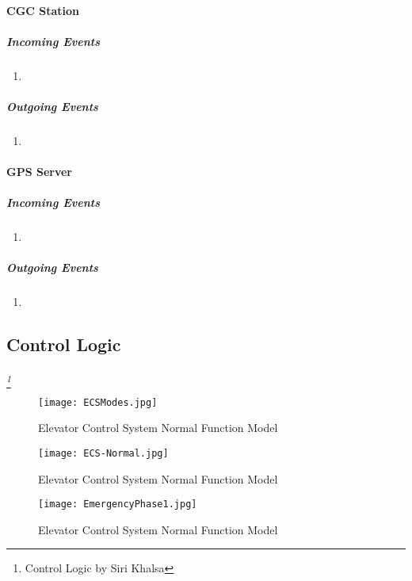\documentclass[12pt]{article}
\begin{document}
		\paragraph{CGC Station}
		\textit{}
			\subparagraph{Incoming Events}
				\begin{enumerate}
					\item 
				\end{enumerate}
				
			\subparagraph{Outgoing Events}
				\begin{enumerate}
					\item 
				\end{enumerate}

		\paragraph{GPS Server}
		\textit{}
			\subparagraph{Incoming Events}
				\begin{enumerate}
					\item 
				\end{enumerate}
				
			\subparagraph{Outgoing Events}
				\begin{enumerate}
					\item 
				\end{enumerate}
				
		
		
		\subsection{Control Logic} \label{logic}%
		\paragraph{} \textit{ \footnote{Control Logic by Siri Khalsa}}

		\begin{figure}[H]
  			\centerline{\texttt{[image: ECSModes.jpg]}}
  			\caption{Elevator Control System Normal Function Model }
  			\label{fig:normal}
		\end{figure}

		\begin{figure}[H]
  			\centerline{\texttt{[image: ECS-Normal.jpg]}}
  			\caption{Elevator Control System Normal Function Model }
  			\label{fig:normal}
		\end{figure}
	
		\begin{figure}[H]
  			\centerline{\texttt{[image: EmergencyPhase1.jpg]}}
  			\caption{Elevator Control System Normal Function Model }
  			\label{fig:emerg}
		\end{figure}
\end{document}
